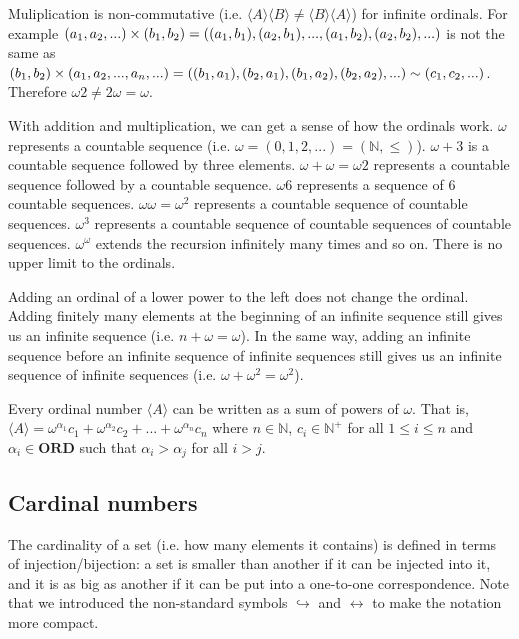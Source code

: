 \documentclass{article}
\def\ordinals{\textbf{ORD}}
\def\ordeq{\sim}
\def\crdleq{\hookrightarrow}
\def\crdeq{\leftrightarrow}
\begin{document}
\begin{remark}
	Muliplication is non-commutative (i.e. $\langle A \rangle \langle B \rangle \neq \langle B \rangle \langle A \rangle$) for infinite ordinals. For example $(a_1, a_2, ...) \times (b_1, b_2) = ((a_1, b_1), (a_2, b_1), ..., (a_1, b_2), (a_2, b_2), \\...)$ is not the same as $(b_1, b_2) \times (a_1, a_2, ..., a_n, ...) = ((b_1, a_1), (b_2, a_1), (b_1, a_2), \\ (b_2, a_2), ...) \ordeq (c_1, c_2, ...)$. Therefore $\omega 2 \neq 2 \omega = \omega$.
	
	With addition and multiplication, we can get a sense of how the ordinals work. $\omega$ represents a countable sequence (i.e. $\omega = (0, 1, 2, ...) = (\mathbb{N}, \leq)$). $\omega +3$ is a countable sequence followed by three elements. $\omega + \omega  = \omega2$ represents a countable sequence followed by a countable sequence. $\omega6$ represents a sequence of 6 countable sequences. $\omega\omega = \omega^2$ represents a countable sequence of countable sequences. $\omega^3$ represents a countable sequence of countable sequences of countable sequences. $\omega^\omega$ extends the recursion infinitely many times and so on. There is no upper limit to the ordinals.
	
	Adding an ordinal of a lower power to the left does not change the ordinal. Adding finitely many elements at the beginning of an infinite sequence still gives us an infinite sequence (i.e. $n + \omega = \omega$). In the same way, adding an infinite sequence before an infinite sequence of infinite sequences still gives us an infinite sequence of infinite sequences (i.e. $\omega +\omega^2 = \omega^2$).
\end{remark}

\begin{prop}
	Every ordinal number $\langle A \rangle$ can be written as a sum of powers of $\omega$. That is, $\langle A \rangle = \omega^{\alpha_1} c_1 + \omega^{\alpha_2} c_2 + ... + \omega^{\alpha_n} c_n$ where $n \in \mathbb{N}$, $c_i \in \mathbb{N}^+$ for all $1 \leq i \leq n$ and $\alpha_i \in \ordinals$ such that $\alpha_i > \alpha_j$ for all $i > j$.
\end{prop}

\subsection{Cardinal numbers}

\begin{remark}
	The cardinality of a set (i.e. how many elements it contains) is defined in terms of injection/bijection: a set is smaller than another if it can be injected into it, and it is as big as another if it can be put into a one-to-one correspondence.  Note that we introduced the non-standard symbols $\crdleq$ and $\crdeq$ to make the notation more compact.
\end{remark}
\end{document}

